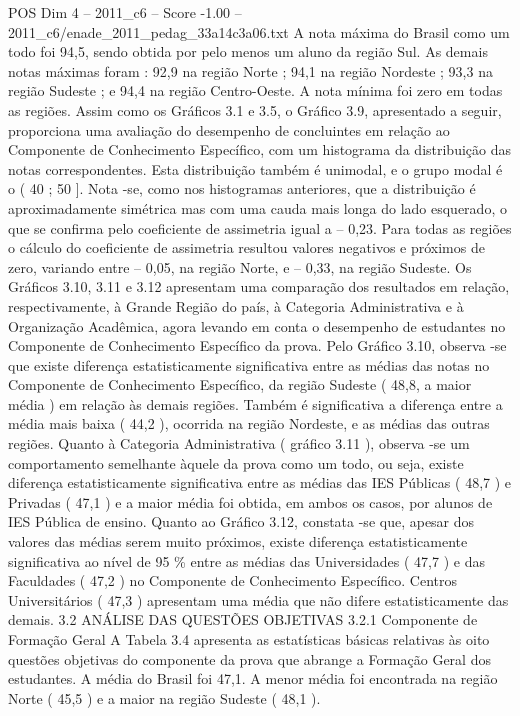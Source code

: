 \begin{textsample}{POS Dim 4 – 2011\_c6 – Score -1.00 – 2011\_c6/enade\_2011\_pedag\_33a14c3a06.txt}
A nota máxima do Brasil como um todo foi 94,5, sendo obtida por pelo menos um aluno da região Sul.
As demais notas máximas foram : 92,9 na região Norte ; 94,1 na região Nordeste ; 93,3 na região Sudeste ; e 94,4 na região Centro-Oeste.
A nota mínima foi zero em todas as regiões.
Assim como os Gráficos 3.1 e 3.5, o Gráfico 3.9, apresentado a seguir, proporciona uma avaliação do desempenho de concluintes em relação ao Componente de Conhecimento Específico, com um histograma da distribuição das notas correspondentes.
Esta distribuição também é unimodal, e o grupo modal é o ( 40 ; 50 ].
Nota -se, como nos histogramas anteriores, que a distribuição é aproximadamente simétrica mas com uma cauda mais longa do lado esquerado, o que se confirma pelo coeficiente de assimetria igual a – 0,23.
Para todas as regiões o cálculo do coeficiente de assimetria resultou valores negativos e próximos de zero, variando entre – 0,05, na região Norte, e – 0,33, na região Sudeste.
Os Gráficos 3.10, 3.11 e 3.12 apresentam uma comparação dos resultados em relação, respectivamente, à Grande Região do país, à Categoria Administrativa e à Organização Acadêmica, agora levando em conta o desempenho de estudantes no Componente de Conhecimento Específico da prova.
Pelo Gráfico 3.10, observa -se que existe diferença estatisticamente significativa entre as médias das notas no Componente de Conhecimento Específico, da região Sudeste ( 48,8, a maior média ) em relação às demais regiões.
Também é significativa a diferença entre a média mais baixa ( 44,2 ), ocorrida na região Nordeste, e as médias das outras regiões.
Quanto à Categoria Administrativa ( gráfico 3.11 ), observa -se um comportamento semelhante àquele da prova como um todo, ou seja, existe diferença estatisticamente significativa entre as médias das IES Públicas ( 48,7 ) e Privadas ( 47,1 ) e a maior média foi obtida, em ambos os casos, por alunos de IES Pública de ensino.
Quanto ao Gráfico 3.12, constata -se que, apesar dos valores das médias serem muito próximos, existe diferença estatisticamente significativa ao nível de 95 \% entre as médias das Universidades ( 47,7 ) e das Faculdades ( 47,2 ) no Componente de Conhecimento Específico.
Centros Universitários ( 47,3 ) apresentam uma média que não difere estatisticamente das demais. 3.2 ANÁLISE DAS QUESTÕES OBJETIVAS 3.2.1 Componente de Formação Geral A Tabela 3.4 apresenta as estatísticas básicas relativas às oito questões objetivas do componente da prova que abrange a Formação Geral dos estudantes.
A média do Brasil foi 47,1.
A menor média foi encontrada na região Norte ( 45,5 ) e a maior na região Sudeste ( 48,1 ).

\end{textsample}
